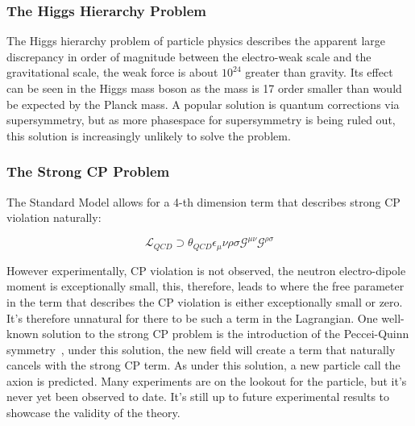 



\subsubsection{The Higgs Hierarchy Problem}
The Higgs hierarchy problem of particle physics describes the apparent large discrepancy in order of magnitude between the electro-weak scale and the gravitational scale, the weak force is about $10^{24}$ greater than gravity. Its effect can be seen in the Higgs mass boson as the mass is 17 order smaller than would be expected by the Planck mass. 
A popular solution is quantum corrections via supersymmetry, but as more phasespace for supersymmetry is being ruled out, this solution is increasingly unlikely to solve the problem. 


\subsubsection{The Strong CP Problem}
The Standard Model allows for a 4-th dimension term that describes strong CP violation naturally:

\begin{equation}
    \mathcal{L}_{QCD} \supset \theta_{QCD}\epsilon_\mu\nu\rho\sigma \mathcal{G}^{\mu\nu}\mathcal{G}^{\rho\sigma}
\end{equation}

However experimentally, CP violation is not observed, the neutron electro-dipole moment is exceptionally small, this, therefore, leads to where the free parameter in the term that describes the CP violation is either exceptionally small or zero. It's therefore unnatural for there to be such a term in the Lagrangian.
One well-known solution to the strong CP problem is the introduction of the Peccei-Quinn symmetry~\cite{PQSym}, under this solution, the new field will create a term that naturally cancels with the strong CP term. As under this solution, a new particle call the axion is predicted. Many experiments are on the lookout for the particle, but it's never yet been observed to date. It's still up to future experimental results to showcase the validity of the theory.

